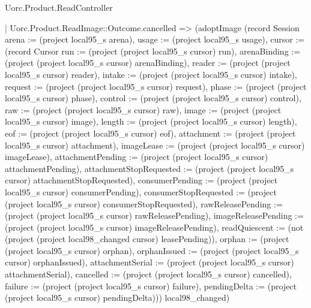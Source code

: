\begin{lexlean}{Uorc.Product.ReadController}
\begin{semanticmodule}
{      | Uorc.Product.ReadImage::Outcome.cancelled => (adoptImage (record Session {arena := (project local95_s arena), usage := (project local95_s usage), cursor := (record Cursor {run := (project (project local95_s cursor) run), arenaBinding := (project (project local95_s cursor) arenaBinding), reader := (project (project local95_s cursor) reader), intake := (project (project local95_s cursor) intake), request := (project (project local95_s cursor) request), phase := (project (project local95_s cursor) phase), control := (project (project local95_s cursor) control), raw := (project (project local95_s cursor) raw), image := (project (project local95_s cursor) image), length := (project (project local95_s cursor) length), eof := (project (project local95_s cursor) eof), attachment := (project (project local95_s cursor) attachment), imageLease := (project (project local95_s cursor) imageLease), attachmentPending := (project (project local95_s cursor) attachmentPending), attachmentStopRequested := (project (project local95_s cursor) attachmentStopRequested), consumerPending := (project (project local95_s cursor) consumerPending), consumerStopRequested := (project (project local95_s cursor) consumerStopRequested), rawReleasePending := (project (project local95_s cursor) rawReleasePending), imageReleasePending := (project (project local95_s cursor) imageReleasePending), readQuiescent := (not (project (project local98_changed cursor) leasePending)), orphan := (project (project local95_s cursor) orphan), orphanIssued := (project (project local95_s cursor) orphanIssued), attachmentSerial := (project (project local95_s cursor) attachmentSerial), cancelled := (project (project local95_s cursor) cancelled), failure := (project (project local95_s cursor) failure), pendingDelta := (project (project local95_s cursor) pendingDelta)})}) local98_changed)
}
\end{semanticmodule}
\end{lexlean}
